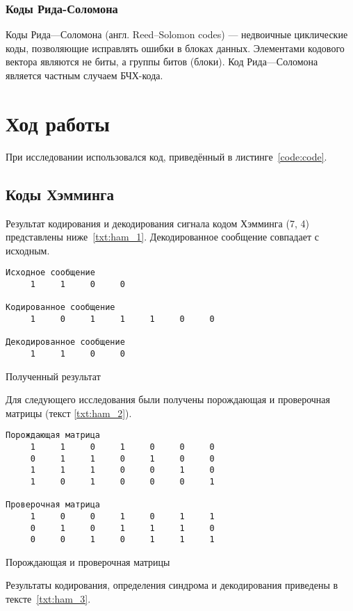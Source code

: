 \subsubsection{Коды Рида-Соломона}
Коды Рида—Соломона (англ. Reed–Solomon codes) — недвоичные циклические коды, позволяющие исправлять ошибки в блоках данных. Элементами кодового вектора являются не биты, а группы битов (блоки).
Код Рида—Соломона является частным случаем БЧХ-кода.

\section{Ход работы}

При исследовании использовался код, приведённый в листинге~\ref{code:code}.

\subsection{Коды Хэмминга}
Результат кодирования и декодирования сигнала кодом Хэмминга (7, 4) представлены ниже~\ref{txt:ham_1}.
Декодированное сообщение совпадает с исходным.
\begin{program}
\begin{verbatim}
Исходное сообщение
     1     1     0     0

Кодированное сообщение
     1     0     1     1     1     0     0

Декодированное сообщение
     1     1     0     0
\end{verbatim}
\caption{Полученный результат}
\label{txt:ham_1}
\end{program}

Для следующего исследования были получены порождающая и проверочная матрицы (текст \ref{txt:ham_2}).

\begin{program}
\begin{verbatim}
Порождающая матрица
     1     1     0     1     0     0     0
     0     1     1     0     1     0     0
     1     1     1     0     0     1     0
     1     0     1     0     0     0     1

Проверочная матрица
     1     0     0     1     0     1     1
     0     1     0     1     1     1     0
     0     0     1     0     1     1     1
\end{verbatim}
\caption{Порождающая и проверочная матрицы}
\label{txt:ham_2}
\end{program}

Результаты кодирования, определения синдрома и декодирования приведены в тексте~\ref{txt:ham_3}.

